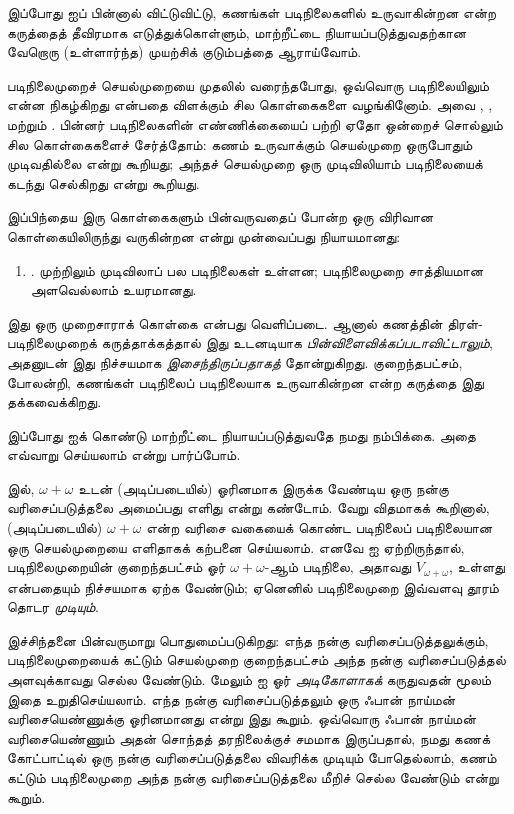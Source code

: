 \documentclass[../../../include/open-logic-section]{subfiles}
\begin{document}

இப்போது \limofsize{} ஐப் பின்னால் விட்டுவிட்டு, கணங்கள் படிநிலைகளில்
உருவாகின்றன என்ற கருத்தைத் தீவிரமாக எடுத்துக்கொள்ளும், மாற்றீட்டை
நியாயப்படுத்துவதற்கான வேறொரு (உள்ளார்ந்த) முயற்சிக் குடும்பத்தை ஆராய்வோம்.

படிநிலைமுறைச் செயல்முறையை முதலில் வரைந்தபோது, ஒவ்வொரு படிநிலையிலும் என்ன
நிகழ்கிறது என்பதை விளக்கும் சில கொள்கைகளை வழங்கினோம். அவை
\stageshier, \stagesord, மற்றும் \stagesacc. பின்னர் படிநிலைகளின்
எண்ணிக்கையைப் பற்றி ஏதோ ஒன்றைச் சொல்லும் சில கொள்கைகளைச் சேர்த்தோம்:
கணம் உருவாக்கும் செயல்முறை ஒருபோதும் முடிவதில்லை என்று \stagessucc{}
கூறியது; அந்தச் செயல்முறை ஒரு முடிவிலியாம் படிநிலையைக் கடந்து செல்கிறது
என்று \stagesinf{} கூறியது.

இப்பிந்தைய இரு கொள்கைகளும் பின்வருவதைப் போன்ற ஒரு விரிவான கொள்கையிலிருந்து
வருகின்றன என்று முன்வைப்பது நியாயமானது:
\begin{enumerate}
	\item[] \stagesinex. முற்றிலும் முடிவிலாப் பல படிநிலைகள் உள்ளன;
	படிநிலைமுறை சாத்தியமான அளவெல்லாம் உயரமானது.
\end{enumerate}
இது ஒரு முறைசாராக் கொள்கை என்பது வெளிப்படை. ஆனால் கணத்தின்
திரள்-படிநிலைமுறைக் கருத்தாக்கத்தால் இது உடனடியாக
\emph{பின்விளைவிக்கப்படாவிட்டாலும்}, அதனுடன் இது நிச்சயமாக
\emph{இசைந்திருப்பதாகத்} தோன்றுகிறது. குறைந்தபட்சம், \limofsize{} போலன்றி,
கணங்கள் படிநிலைப் படிநிலையாக உருவாகின்றன என்ற கருத்தை இது
தக்கவைக்கிறது.

இப்போது \stagesinex{} ஐக் கொண்டு மாற்றீட்டை நியாயப்படுத்துவதே நமது நம்பிக்கை.
அதை எவ்வாறு செய்யலாம் என்று பார்ப்போம்.

 இல், $\omega+\omega$ உடன் (அடிப்படையில்)
ஓரினமாக இருக்க வேண்டிய ஒரு நன்கு வரிசைப்படுத்தலை அமைப்பது எளிது என்று
கண்டோம். வேறு விதமாகக் கூறினால், (அடிப்படையில்) $\omega+\omega$ என்ற
வரிசை வகையைக் கொண்ட படிநிலைப் படிநிலையான ஒரு செயல்முறையை எளிதாகக்
கற்பனை செய்யலாம். எனவே \stagesinex{} ஐ ஏற்றிருந்தால், படிநிலைமுறையின்
குறைந்தபட்சம் ஓர் $\omega+\omega$-ஆம் படிநிலை, அதாவது
$V_{\omega+\omega}$, உள்ளது என்பதையும் நிச்சயமாக ஏற்க வேண்டும்; ஏனெனில்
படிநிலைமுறை இவ்வளவு தூரம் தொடர \emph{முடியும்}.

இச்சிந்தனை பின்வருமாறு பொதுமைப்படுகிறது: எந்த நன்கு வரிசைப்படுத்தலுக்கும்,
படிநிலைமுறையைக் கட்டும் செயல்முறை குறைந்தபட்சம் அந்த நன்கு வரிசைப்படுத்தல்
அளவுக்காவது செல்ல வேண்டும். மேலும்
 ஐ ஓர்
\emph{அடிகோளாகக்} கருதுவதன் மூலம் இதை உறுதிசெய்யலாம். எந்த நன்கு
வரிசைப்படுத்தலும் ஒரு ஃபான் நாய்மன் வரிசையெண்ணுக்கு ஓரினமானது என்று இது
கூறும். ஒவ்வொரு ஃபான் நாய்மன் வரிசையெண்ணும் அதன் சொந்தத் தரநிலைக்குச்
சமமாக இருப்பதால், நமது கணக் கோட்பாட்டில் ஒரு நன்கு வரிசைப்படுத்தலை
விவரிக்க முடியும் போதெல்லாம், கணம் கட்டும் படிநிலைமுறை அந்த நன்கு
வரிசைப்படுத்தலை மீறிச் செல்ல வேண்டும் என்று
 கூறும்.
\end{document}
